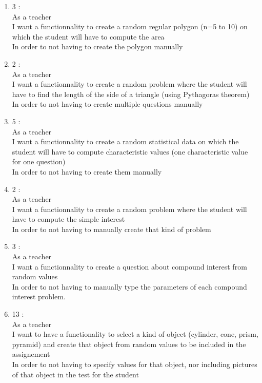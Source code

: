 \documentclass{article}
\begin{document}
\begin{enumerate}
    \item 3 :\\ %
    As a teacher\\
    I want a functionnality to create a random regular polygon (n=5 to 10) on which the student will have to compute the area\\
    In order to not having to create the polygon manually\\

    \item 2 :\\ %
    As a teacher\\
    I want a functionnality to create a random problem where the student will have to find the length of the side of a triangle (using Pythagoras theorem)\\
    In order to not having to create multiple questions manually \\

    \item 5 :\\ %
    As a teacher\\
    I want a functionnality to create a random statistical data on which the student will have to compute characteristic values (one characteristic value for one question)\\
    In order to not having to create them manually\\

    \item 2 :\\ %
    As a teacher\\
    I want a functionnality to create a random problem where the student will have to compute the simple interest\\
    In order to not having to manually create that kind of problem\\

    \item 3 :\\ %
    As a teacher\\
    I want a functionnality to create a question about compound interest from random values\\
    In order to not having to manually type the parameters of each compound interest problem.\\

    \item 13 : \\ %
    As a teacher\\
    I want to have a functionality to select a kind of object (cylinder, cone, prism, pyramid) and create that object from random values to be included in the assignement\\
    In order to not having to specify values for that object, nor including pictures of that object in the test for the student\\

\end{enumerate}
\end{document}
